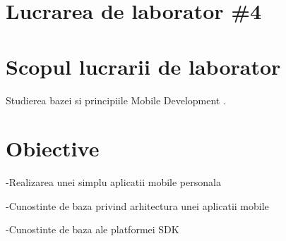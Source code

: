 \section*{Lucrarea de laborator \#4}




\section{Scopul lucrarii de laborator}

Studierea bazei si principiile Mobile Development  .

\section{Obiective}


   -Realizarea unei simplu aplicatii mobile personala

-Cunostinte de baza privind arhitectura unei aplicatii mobile

-Cunostinte de baza ale platformei SDK

